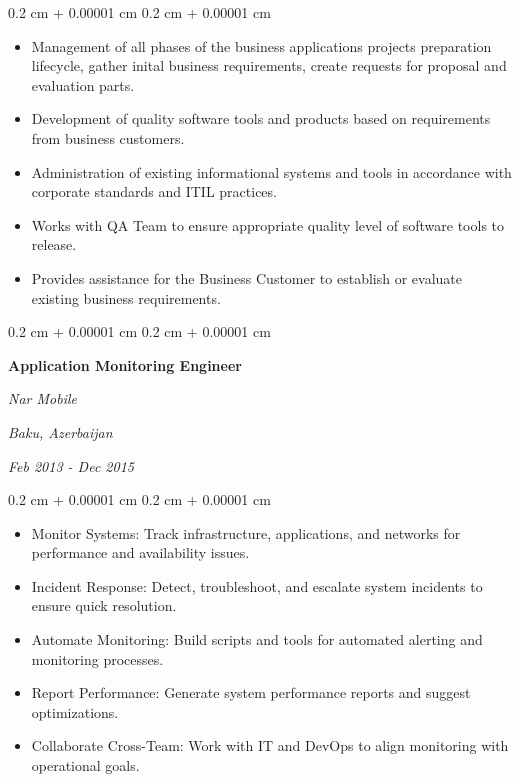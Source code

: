 \documentclass[10pt, letterpaper]{article}
\newenvironment{highlights}{
  \begin{itemize}[
        topsep=0.10 cm,
        parsep=0.10 cm,
        partopsep=0pt,
        itemsep=0pt,
        leftmargin=0.4 cm + 10pt
      ]
    }{
  \end{itemize}
} %
\newenvironment{onecolentry}{
  \begin{adjustwidth}{
      0.2 cm + 0.00001 cm
    }{
      0.2 cm + 0.00001 cm
    }
  }{
  \end{adjustwidth}
} %
\newenvironment{twocolentry}[2][]{
  \onecolentry
  \def\secondColumn{#2}
  \setcolumnwidth{\fill, 4.5 cm}
  \begin{paracol}{2}
  }{
    \switchcolumn \raggedleft \secondColumn
  \end{paracol}
  \endonecolentry
} %
\begin{document}
\vspace{0.2 cm}
\begin{onecolentry}
  \begin{highlights}
  \item Management of all phases of the business applications
    projects preparation lifecycle, gather inital business
    requirements, create requests for proposal and evaluation parts.
  \item Development of quality software tools and products based on
    requirements from business customers.
  \item Administration of existing informational systems and tools in
    accordance with corporate standards and ITIL practices.
  \item Works with QA Team to ensure appropriate quality level of
    software tools to release.
  \item Provides assistance for the Business Customer to establish or
    evaluate existing business requirements.
  \end{highlights}
\end{onecolentry}

\vspace{0.3 cm}

\begin{twocolentry}{
    \textit{Baku, Azerbaijan}

  \textit{Feb 2013 - Dec 2015}}
  \textbf{Application Monitoring Engineer}

  \textit{Nar Mobile}
\end{twocolentry}

\vspace{0.2 cm}
\begin{onecolentry}
  \begin{highlights}
  \item Monitor Systems: Track infrastructure, applications, and
    networks for performance and availability issues.
  \item Incident Response: Detect, troubleshoot, and escalate system
    incidents to ensure quick resolution.
  \item Automate Monitoring: Build scripts and tools for automated
    alerting and monitoring processes.
  \item Report Performance: Generate system performance reports and
    suggest optimizations.
  \item Collaborate Cross-Team: Work with IT and DevOps to align
    monitoring with operational goals.
  \end{highlights}
\end{onecolentry}
\end{document}

